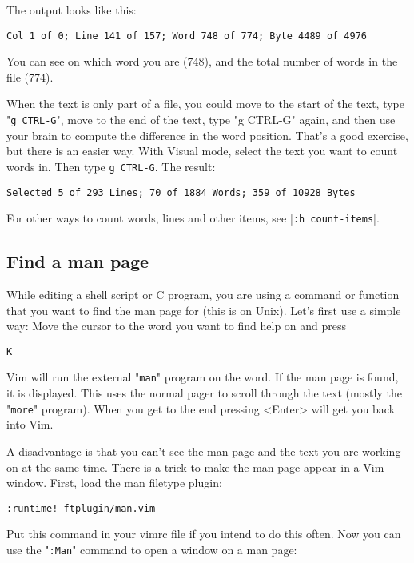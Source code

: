 The output looks like this:

\begin{Verbatim}[samepage=true]
    Col 1 of 0; Line 141 of 157; Word 748 of 774; Byte 4489 of 4976 
\end{Verbatim}

You can see on which word you are (748), and the total number of words in the file (774).

When the text is only part of a file, you could move to the start of the text, type "\texttt{g CTRL-G}", move to the end of the text, type "g CTRL-G" again, and then use your brain to compute the difference in the word position.
That's a good exercise, but there is an easier way.
With Visual mode, select the text you want to count words in.
Then type \texttt{g CTRL-G}.
The result:

\begin{Verbatim}[samepage=true]
    Selected 5 of 293 Lines; 70 of 1884 Words; 359 of 10928 Bytes 
\end{Verbatim}

For other ways to count words, lines and other items, see |\texttt{:h count-items}|.
\subsection{Find a man page}
\label{find-manpage}
While editing a shell script or C program, you are using a command or function that you want to find the man page for (this is on Unix).
Let's first use a simple way: Move the cursor to the word you want to find help on and press

\begin{Verbatim}[samepage=true]
 K
\end{Verbatim}

Vim will run the external "\texttt{man}" program on the word.
If the man page is found, it is displayed.
This uses the normal pager to scroll through the text (mostly the "\texttt{more}" program).
When you get to the end pressing <Enter> will get you back into Vim.

A disadvantage is that you can't see the man page and the text you are working on at the same time.
There is a trick to make the man page appear in a Vim window.
First, load the man filetype plugin:

\begin{Verbatim}[samepage=true]
 :runtime! ftplugin/man.vim
\end{Verbatim}

Put this command in your vimrc file if you intend to do this often.
Now you can use the "\texttt{:Man}" command to open a window on a man page:

